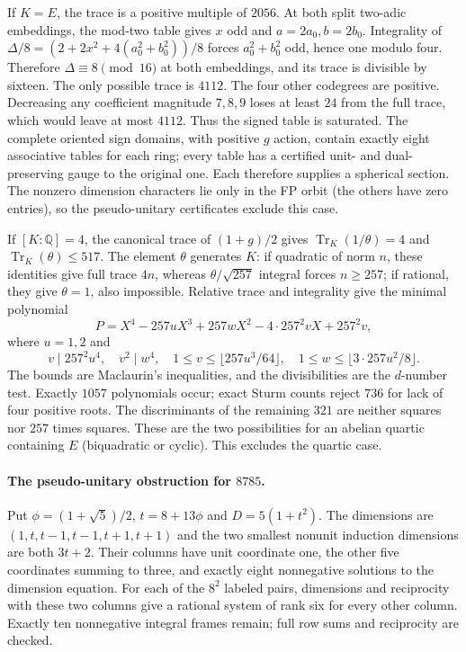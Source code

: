 If $K=E$, the trace is a positive multiple of $2056$.
At both split two-adic embeddings, the mod-two table gives $x$ odd and
$a=2a_0,b=2b_0$. Integrality of
$\Delta/8=(2+2x^2+4(a_0^2+b_0^2))/8$ forces
$a_0^2+b_0^2$ odd, hence one modulo four. Therefore
$\Delta\equiv8\pmod{16}$ at both embeddings, and its trace is
divisible by sixteen. The only possible trace is $4112$.
The four other codegrees are positive. Decreasing any coefficient
magnitude $7,8,9$ loses at least $24$ from the full trace, which
would leave at most $4112$. Thus the signed table is saturated.
The complete oriented sign domains, with positive $g$ action, contain
exactly eight associative tables for each ring; every table has a
certified unit- and dual-preserving gauge to the original one.
Each therefore supplies a spherical section. The nonzero dimension
characters lie only in the FP orbit (the others have zero entries),
so the pseudo-unitary certificates exclude this case.

If $[K:\mathbb Q]=4$, the canonical trace of $(1+g)/2$ gives
$\operatorname{Tr}_K(1/\theta)=4$ and
$\operatorname{Tr}_K(\theta)\le517$.
The element $\theta$ generates $K$: if quadratic of norm $n$, these
identities give full trace $4n$, whereas
$\theta/\sqrt{257}$ integral forces $n\ge257$; if rational, they
give $\theta=1$, also impossible. Relative trace and integrality give
the minimal polynomial
\[
 P=X^4-257uX^3+257wX^2-4\cdot257^2vX+257^2v,
\]
where $u=1,2$ and
\[
 v\mid257^2u^4,\quad v^2\mid w^4,\quad
 1\le v\le\lfloor257u^3/64\rfloor,\quad
 1\le w\le\lfloor3\cdot257u^2/8\rfloor.
\]
The bounds are Maclaurin's inequalities, and the divisibilities are
the $d$-number test. Exactly $1057$ polynomials occur; exact Sturm
counts reject $736$ for lack of four positive roots. The discriminants
of the remaining $321$ are neither squares nor $257$ times squares.
These are the two possibilities for an abelian quartic containing $E$
(biquadratic or cyclic). This excludes the quartic case.

\paragraph{The pseudo-unitary obstruction for $8785$.}
Put $\phi=(1+\sqrt5)/2$, $t=8+13\phi$ and
$D=5(1+t^2)$. The dimensions are
$(1,t,t-1,t-1,t+1,t+1)$ and the two smallest nonunit induction
dimensions are both $3t+2$. Their columns have unit coordinate one,
the other five coordinates summing to three, and exactly eight
nonnegative solutions to the dimension equation. For each of the
$8^2$ labeled pairs, dimensions and reciprocity with these two
columns give a rational system of rank six for every other column.
Exactly ten nonnegative integral frames remain; full row sums and
reciprocity are checked.

